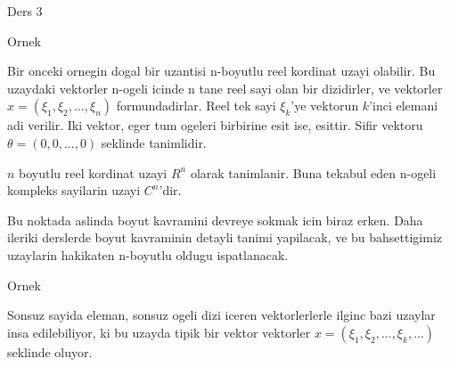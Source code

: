 \documentclass[12pt,fleqn]{article}
\begin{document}
Ders 3

Ornek 

Bir onceki ornegin dogal bir uzantisi n-boyutlu reel kordinat uzayi
olabilir. Bu uzaydaki vektorler n-ogeli icinde n tane reel sayi olan bir
dizidirler, ve vektorler $x = (\xi_1, \xi_2,...,\xi_n)$
formundadirlar. Reel tek sayi $\xi_k$'ye vektorun $k$'inci elemani adi
verilir. Iki vektor, eger tum ogeleri birbirine esit ise, esittir. Sifir
vektoru $\theta = (0,0,...,0)$ seklinde tanimlidir. 

$n$ boyutlu reel kordinat uzayi $R^n$ olarak tanimlanir. Buna tekabul eden
n-ogeli kompleks sayilarin uzayi $C^n$'dir. 

Bu noktada aslinda boyut kavramini devreye sokmak icin biraz erken. Daha
ileriki derslerde boyut kavraminin detayli tanimi yapilacak, ve bu
bahsettigimiz uzaylarin hakikaten n-boyutlu oldugu ispatlanacak. 

Ornek 

Sonsuz sayida eleman, sonsuz ogeli dizi iceren vektorlerlerle ilginc bazi
uzaylar insa edilebiliyor, ki bu uzayda tipik bir vektor vektorler 
$x =
(\xi_1, \xi_2,...,\xi_k,...)$ seklinde oluyor. 
\end{document}
